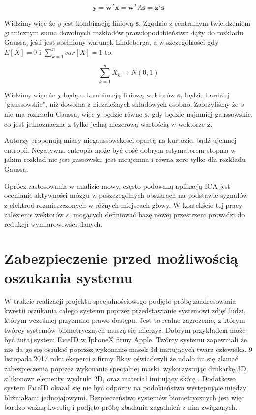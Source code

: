 \documentclass[oneside, eng]{mgr}
\newcommand{\bb}{\textbf}
\begin{document}
\begin{equation}
	\bb{y} = \bb{w}^T \bb{x} = \bb{w}^T A \bb{s} = \bb{z}^T \bb{s} 
\end{equation}

Widzimy więc że $y$ jest kombinacją liniową \bb{s}. Zgodnie z centralnym twierdzeniem granicznym suma dowolnych rozkładów prawdopodobieństwa dąży do rozkładu Gaussa, jeśli jest spełniony warunek Lindeberga, a w szczególności gdy $E[X] = 0$ i $\sum_{k=1}^{n}var[X] = 1$ to:

\begin{equation}
	\sum_{k=1}^{n} X_k \to N(0,1)
\end{equation}

Widzimy więc że $\bb{y}$ będące kombinacją liniową wektorów $\bb{s}$, będzie bardziej "gaussowskie", niż dowolna z niezależnych składowych osobno. Założyliśmy że $s$ nie ma rozkładu Gaussa, więc $\bb{y}$ będzie równe $\bb{s}$, gdy będzie najmniej gaussowskie, co jest jednoznaczne z tylko jedną niezerową wartością w wektorze $\bb{z}$.

Autorzy \cite{ICA} proponują miary niegaussowskości opartą na kurtozie, bądź ujemnej entropii. Negatywna entropia może być dość dobrym estymatorem stopnia w jakim rozkład nie jest gassowski, jest nieujemna i równa zero tylko dla rozkładu Gaussa.


Oprócz zastosowania w analizie mowy, często podowaną aplikacją ICA jest ocenianie aktywności mózgu w poszczególnych obszarach na podstawie sygnałów z elektrod rozmieszczonych w różnych miejscach głowy. W kontekście tej pracy zalezienie wektorów $s$, mogących definiować bazę nowej przestrzeni prowadzi do redukcji wymiarowowści danych.

\newpage

\chapter{Zabezpieczenie przed możliwością oszukania systemu}

W trakcie realizacji projektu specjalnościowego podjęto próbę zaadresowania kwestii oszukania całego systemu poprzez przedstawianie systemowi zdjęć ludzi, którym wcześniej przyznano prawo dostępu. Jest to realne zagrożenie, z którym twórcy systemów biometrycznych muszą się mierzyć. Dobrym przykładem może być tutaj system FaceID w IphoneX firmy Apple. Twórcy systemu zapewniali że nie da go się oszukać poprzez wykonanie masek 3d imitujących twarz człowieka. 9 listopada 2017 roku eksperci z firmy Bkav oświadczyli że udało im się złamać zabezpieczenia poprzez wykonanie specjalnej maski, wykorzystując drukarkę 3D, silikonowe elementy, wydruki 2D, oraz materiał imitujący skórę \cite{FaceID hacked}. Dodatkowo system FaceID okazał się nie być odporny na podobieństwo występujące między bliźniakami jednojajowymi. Bezpieczeństwo systemów biometrycznych jest więc bardzo ważną kwestią i podjęto próbę zbadania zagadnień z nim związanych.
\end{document}
